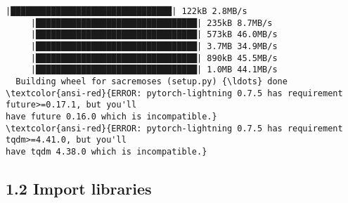 \documentclass[10pt]{article}
\begin{document}
    \begin{Verbatim}[commandchars=\\\{\}]
     |████████████████████████████████| 122kB 2.8MB/s
     |████████████████████████████████| 235kB 8.7MB/s
     |████████████████████████████████| 573kB 46.0MB/s
     |████████████████████████████████| 3.7MB 34.9MB/s
     |████████████████████████████████| 890kB 45.5MB/s
     |████████████████████████████████| 1.0MB 44.1MB/s
  Building wheel for sacremoses (setup.py) {\ldots} done
\textcolor{ansi-red}{ERROR: pytorch-lightning 0.7.5 has requirement future>=0.17.1, but you'll
have future 0.16.0 which is incompatible.}
\textcolor{ansi-red}{ERROR: pytorch-lightning 0.7.5 has requirement tqdm>=4.41.0, but you'll
have tqdm 4.38.0 which is incompatible.}
    \end{Verbatim}

    \hypertarget{import-libraries}{%
\subsection*{1.2 Import libraries}\label{import-libraries}}
\end{document}
